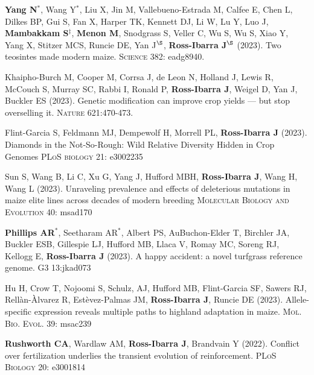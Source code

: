 \documentclass[letterpaper,10pt]{article}
\begin{document}
\begin{etaremune}
\item \textbf{Yang N}$^*$, Wang Y$^*$,  Liu X, Jin M, Vallebueno-Estrada M, Calfee E, Chen L, Dilkes BP, Gui S, Fan X, Harper TK, Kennett DJ, Li W, Lu Y, Luo J, \textbf{Mambakkam S}$^\ddagger$, \textbf{Menon M}, Snodgrass S, Veller C, Wu S, Wu S, Xiao Y, Yang X, Stitzer MCS, Runcie DE, Yan J$^\S$, \textbf{Ross-Ibarra J}$^\S$ (2023). Two teosintes made modern maize. \textsc{Science} 382: eadg8940.

\item Khaipho-Burch M, Cooper M, Corrsa J, de Leon N, Holland J, Lewis R, McCouch S, Murray SC, Rabbi I, Ronald P, \textbf{Ross-Ibarra J}, Weigel D, Yan J, Buckler ES (2023). Genetic modification can improve crop yields --- but stop overselling it. \textsc{Nature} 621:470-473.

\item Flint-Garcia S,  Feldmann MJ, Dempewolf H,  Morrell PL, \textbf{Ross-Ibarra J} (2023). Diamonds in the Not-So-Rough: Wild Relative Diversity Hidden in Crop Genomes \textsc{PLoS biology} 21: e3002235	

\item Sun S, Wang B, Li C, Xu G, Yang J, Hufford MBH, \textbf{Ross-Ibarra J}, Wang H, Wang L (2023). Unraveling prevalence and effects of deleterious mutations in maize elite lines across decades of modern breeding \textsc{Molecular Biology and Evolution} 40: msad170

\item \textbf{Phillips AR}$^*$, Seetharam AR$^*$, Albert PS, AuBuchon-Elder T, Birchler JA, Buckler ESB,    Gillespie LJ, Hufford MB,    Llaca V,  Romay MC,  Soreng RJ, Kellogg E, \textbf{Ross-Ibarra J} (2023). A happy accident: a novel turfgrass reference genome. \textsc{G3} 13:jkad073

\item Hu H, Crow T, Nojoomi S, Schulz, AJ, Hufford MB, Flint-Garcia SF, Sawers RJ, Rell\`{a}n-\`{A}lvarez R, Est\`{e}vez-Palmas JM, \textbf{Ross-Ibarra J}, Runcie DE (2023). Allele-specific expression reveals multiple paths to highland adaptation in maize. \textsc{Mol. Bio. Evol.} 39: msac239

\item \textbf{Rushworth CA}, Wardlaw AM, \textbf{Ross-Ibarra J}, Brandvain Y (2022). Conflict over fertilization underlies the transient evolution of reinforcement. \textsc{PLoS Biology} 20: e3001814 %


\end{etaremune}
\end{document}
